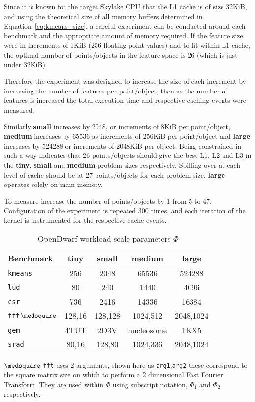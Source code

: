 \documentclass[../document.tex]{subfiles}
\begin{document}
Since it is known for the target Skylake CPU that the L1 cache is of size 32KiB, and using the theoretical size of all memory buffers determined in Equation~\ref{eq:kmeans_size}, a careful experiment can be conducted around each benchmark and the appropriate amount of memory required.
If the feature size were in increments of 1KiB (256 floating point values) and to fit within L1 cache, the optimal number of points/objects in the feature space is 26 (which is just under 32KiB).

Therefore the experiment was designed to increase the size of each increment by increasing the number of features per point/object, then as the number of features is increased the total execution time and respective caching events were measured.

Similarly {\bf small} increases by 2048, or increments of 8KiB per point/object, {\bf medium} increases by 65536 as increments of 256KiB per point/object and {\bf large} increases by 524288 or increments of 2048KiB per object.
Being constrained in such a way indicates that 26 points/objects should give the best L1, L2 and L3 in the {\bf tiny}, {\bf small} and {\bf medium} problem sizes respectively.
Spilling over at each level of cache should be at 27 points/objects for each problem size.
{\bf large} operates solely on main memory.

To measure increase the number of points/objects by 1 from 5 to 47.
Configuration of the experiment is repeated 300 times, and each iteration of the kernel is instrumented for the respective cache events.


\begin{table*}[t]
\centering
\begin{threeparttable}
    \centering
    \caption{OpenDwarf workload scale parameters $\Phi$}
    \begin{tabular}{l|c|c|c|c}
        \bf Benchmark & \bf tiny & small & medium & large\\\hline
        {\tt kmeans}& 256 & 2048 & 65536 & 524288\\
        {\tt lud} & 80 & 240 & 1440 & 4096\\
        {\tt csr} & 736 & 2416 & 14336 & 16384\\
        {\tt fft}$\medsquare$ & 128,16 & 128,128 & 1024,512 & 2048,1024\\
        {\tt gem} & 4TUT & 2D3V & nucleosome & 1KX5\\
        {\tt srad}& 80,16 & 128,80 & 1024,336 & 2048,1024
    \end{tabular}
    \begin{tablenotes}
    \item [$\medsquare$] {\tt fft} uses 2 arguments, shown here as {\tt arg1},{\tt arg2} these correspond to the square matrix size on which to perform a 2 dimensional Fast Fourier Transform. They are used within $\Phi$ using subscript notation, $\Phi_1$ and $\Phi_2$ respectively.
    \end{tablenotes}
    \label{tab:problem_sizes}
\end{threeparttable}
\end{table*}
\end{document}
